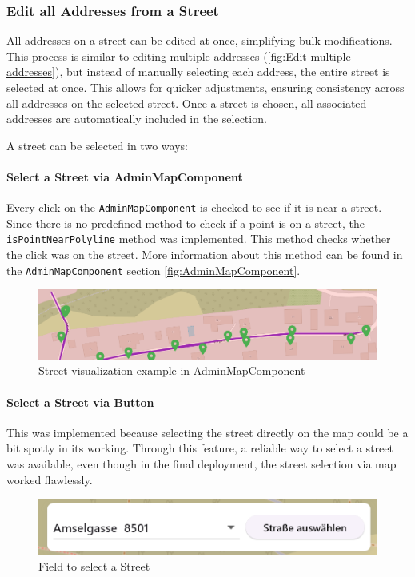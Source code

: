 \subsubsection{Edit all Addresses from a Street}
All addresses on a street can be edited at once, simplifying bulk modifications. This process is similar to editing multiple addresses (\ref{fig:Edit multiple addresses}), but instead of manually selecting each address, the entire street is selected at once. This allows for quicker adjustments, ensuring consistency across all addresses on the selected street. Once a street is chosen, all associated addresses are automatically included in the selection. \blankLine

A street can be selected in two ways:  




\paragraph*{Select a Street via AdminMapComponent}
Every click on the \texttt{AdminMapComponent} is checked to see if it is near a street. Since there is no predefined method to check if a point is on a street, the \texttt{isPointNearPolyline} method was implemented. This method checks whether the click was on the street. More information about this method can be found in the \texttt{AdminMapComponent} section \ref{fig:AdminMapComponent}.\

\begin{figure}[H]
    \centering
    \includegraphics[width=0.6\linewidth]{images/AdminPanel/Street.png}
    \caption{Street visualization example in AdminMapComponent}
\end{figure}


\paragraph*{Select a Street via Button}
This was implemented because selecting the street directly on the map could be a bit spotty in its working. Through this feature, a reliable way to select a street was available, even though in the final deployment, the street selection via map worked flawlessly. 
\begin{figure}[H]
    \centering
    \includegraphics[width=0.6\linewidth]{images/AdminPanel/SelectStreetButton.png}
    \caption{Field to select a Street}
\end{figure}


